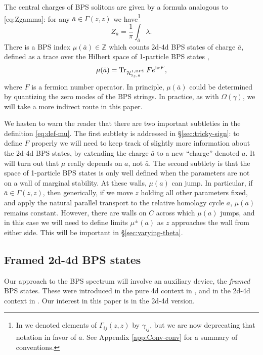 \documentclass[11pt,a4paper]{article}
\def\Z{{\mathbb{Z}}}
\def\CH {{\cal H}}
\newcommand{\ti}[1]{\textit{#1}}
\def\CH {{\cal H}}
\newcommand\I{{\mathrm i}}
\newcommand{\bS}{\mathbb S}
\begin{document}
The central charges of BPS solitons are given by a formula analogous to \eqref{eq:Zgamma}:
for any $\bar a \in \Gamma(z,z)$ we have\footnote{In \cite{Gaiotto:2011tf} we denoted
elements of $\Gamma_{ij}(z,z)$ by $\gamma_{ij}$, but we are now deprecating that notation in favor of $\bar a$.
See Appendix \ref{app:Conv-conv} for a summary of conventions.}
\begin{equation}
 Z_{\bar a} = \frac{1}{\pi} \int_{\bar a} \lambda.
\end{equation}
There is a BPS index $\mu(\bar a) \in \Z$ which counts 2d-4d BPS states
of charge $\bar a$, defined as a trace over the Hilbert space of 1-particle
BPS states \cite{Cecotti:1992qh,Cecotti:1993rm},
\begin{equation} \label{eq:def-mu}
 \mu(\bar a) = {\rm Tr}_{\CH^{1,\rm BPS}_{\bS_z,\bar a}}\,F e^{\I \pi F},
\end{equation}
where $F$ is a fermion number operator.
In principle, $\mu(\bar a)$ could be determined by quantizing the zero modes
of the BPS strings.  In practice, as with $\Omega(\gamma)$, we will take a more
indirect route in this paper.

We hasten to warn the reader that there are two important subtleties
in the definition \eqref{eq:def-mu}.  The first subtlety is
addressed in \S\ref{sec:tricky-sign}:
to define $F$ properly we will need to keep track of slightly more information about
the 2d-4d BPS states, by extending the charge $\bar{a}$ to a new ``charge'' denoted $a$.
It will turn out that $\mu$ really depends on $a$, not $\bar a$.  The second subtlety is that the
space of 1-particle BPS states is only well defined when the parameters are not on
a wall of marginal stability.  At these walls, $\mu(a)$ can jump. In particular,
if $\bar a \in \Gamma(z,z)$, then generically, if we move $z$ holding all other parameters
fixed, and apply the natural parallel transport to the
relative homology cycle $\bar a$, $\mu(a)$ remains constant.  However, there are
walls on $C$ across which $\mu(a)$ jumps, and in this case we will need to
define limits $\mu^\pm(a)$ as $z$ approaches
the wall from either side. This will be important in \S \ref{sec:varying-theta}.


\subsection{Framed 2d-4d BPS states} \label{sec:framed-bps}

Our approach to the BPS spectrum will involve an auxiliary device, the
\ti{framed} BPS states.  These were introduced in the pure 4d context in
\cite{Gaiotto:2010be}, and in the 2d-4d context in \cite{Gaiotto:2011tf}.
Our interest in this paper is in the 2d-4d version.
\end{document}
